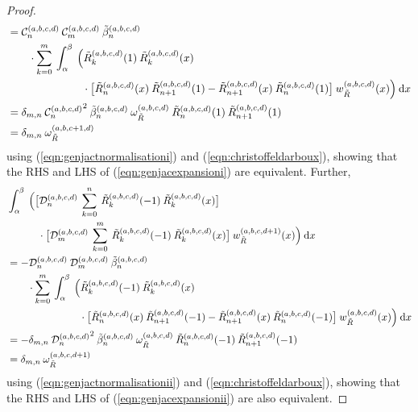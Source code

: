 \documentclass[11pt, oneside]{article}   	%
\newcommand{\genjac}{R}
\newcommand{\genjact}{\tilde{\genjac}}
\newcommand{\genjactw}{w_{\genjact}}
\newcommand{\normgenjact}{\omega_{\genjact}}
\begin{document}
\begin{proof}
\begin{align*}
	&= \mathcal{C}_n^{(a,b,c,d)} \: \mathcal{C}_m^{(a,b,c,d)} \: \tilde{\beta}_n^{(a,b,c,d)} \\
	&\quad \quad \cdot \sum_{k=0}^m \: \int_\alpha^\beta \: \Big(\genjact_{k}^{(a,b,c,d)}(1) \: \genjact_{k}^{(a,b,c,d)}(x) \\
	&\quad \quad \quad \quad \quad \quad \quad \cdot \big[\genjact_{n}^{(a,b,c,d)}(x) \: \genjact_{n+1}^{(a,b,c,d)}(1) - \genjact_{n+1}^{(a,b,c,d)}(x) \: \genjact_{n}^{(a,b,c,d)}(1)\big] \: \genjactw^{(a,b,c,d)}(x)\Big) \: \D x \\
	&= \delta_{m,n} \: {\mathcal{C}_n^{(a,b,c,d)}}^2 \: \tilde{\beta}_n^{(a,b,c,d)} \: \normgenjact^{(a,b,c,d)} \: \genjact_{n}^{(a,b,c,d)}(1) \: \genjact_{n+1}^{(a,b,c,d)}(1) \\
	&= \delta_{m,n} \: \normgenjact^{(a,b,c+1,d)}
\end{align*}
using (\ref{eqn:genjactnormalisationi}) and (\ref{eqn:christoffeldarboux}), showing that the RHS and LHS of (\ref{eqn:genjacexpansioni}) are equivalent. Further,
\begin{align*}
	&\int_\alpha^\beta \: \Big(\big[\mathcal{D}_n^{(a,b,c,d)} \: \sum_{k=0}^n \: \genjact_{k}^{(a,b,c,d)}(-1) \: \genjact_{k}^{(a,b,c,d)}(x)\big] \\
	&\quad \quad \quad \cdot \big[\mathcal{D}_m^{(a,b,c,d)} \: \sum_{k=0}^m \: \genjact_{k}^{(a,b,c,d)}(-1) \: \genjact_{k}^{(a,b,c,d)}(x)\big] \: \genjactw^{(a,b,c,d+1)}(x) \Big) \: \D x \\
	&= - \mathcal{D}_n^{(a,b,c,d)} \: \mathcal{D}_m^{(a,b,c,d)} \: \tilde{\beta}_n^{(a,b,c,d)} \\
	&\quad \quad \cdot \sum_{k=0}^m \: \int_\alpha^\beta \: \Big(\genjact_{k}^{(a,b,c,d)}(-1) \: \genjact_{k}^{(a,b,c,d)}(x) \\
	&\quad \quad \quad \quad \quad \quad \quad \cdot \big[\genjact_{n}^{(a,b,c,d)}(x) \: \genjact_{n+1}^{(a,b,c,d)}(-1) - \genjact_{n+1}^{(a,b,c,d)}(x) \: \genjact_{n}^{(a,b,c,d)}(-1)\big] \: \genjactw^{(a,b,c,d)}(x)\Big) \: \D x \\
	&= - \delta_{m,n} \: {\mathcal{D}_n^{(a,b,c,d)}}^2 \: \tilde{\beta}_n^{(a,b,c,d)} \: \normgenjact^{(a,b,c,d)} \: \genjact_{n}^{(a,b,c,d)}(-1) \: \genjact_{n+1}^{(a,b,c,d)}(-1) \\
	&= \delta_{m,n} \: \normgenjact^{(a,b,c,d+1)}
\end{align*}
using (\ref{eqn:genjactnormalisationii}) and (\ref{eqn:christoffeldarboux}), showing that the RHS and LHS of (\ref{eqn:genjacexpansionii}) are also equivalent. 
\end{proof}
\end{document}
